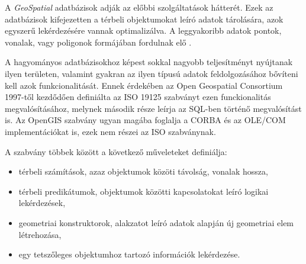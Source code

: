 
A \textit{GeoSpatial} adatbázisok adják az előbbi szolgáltatások hátterét. Ezek az adatbázisok kifejezetten a térbeli objektumokat leíró adatok tárolására, azok egyszerű lekérdezésére
vannak optimalizálva. A leggyakoribb adatok pontok, vonalak, vagy poligonok formájában fordulnak elő \cite{geo}. 

A hagyományos adatbázisokhoz képest sokkal nagyobb teljesítményt nyújtanak
ilyen területen, valamint gyakran az ilyen típusú adatok feldolgozásához bővíteni kell azok funkcionalitását. Ennek érdekében az Open Geospatial Consortium 1997-től kezdődően
definiálta az ISO 19125 szabványt ezen funckionalitás megvalósításához, melynek második része leírja az SQL-ben történő megvalósítást is. Az OpenGIS szabvány ugyan magába
foglalja a CORBA és az OLE/COM implementációkat is, ezek nem részei az ISO szabványnak.

A szabvány többek között a következő műveleteket definiálja:
\begin{itemize}
\item térbeli számítások, azaz objektumok közöti távolság, vonalak hossza,
\item térbeli predikátumok, objektumok közötti kapcsolatokat leíró logikai lekérdezések,
\item geometriai konstruktorok, alakzatot leíró adatok alapján új geometriai elem létrehozása,
\item egy tetszőleges objektumhoz tartozó információk lekérdezése.
\end{itemize}

